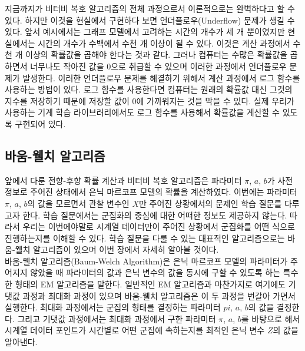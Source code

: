 \documentclass[a4paper]{oblivoir}
\begin{document}
지금까지가 비터비 복호 알고리즘의 전체 과정으로서 이론적으로는 완벽하다고 할 수 있다. 하지만 이것을 현실에서 구현하다 보면 언더플로우(Underflow) 문제가 생길 수 있다. 앞서 예시에서는 그래프 모델에서 고려하는 시간의 개수가 세 개 뿐이였지만 현실에서는 시간의 개수가 수백에서 수천 개 이상이 될 수 있다. 이것은 계산 과정에서 수천 개 이상의 확률값을 곱해야 한다는 것과 같다. 그러나 컴퓨터는 수많은 확률값을 곱하면서 너무나도 작아진 값을 0으로 취급할 수 있으며 이러한 과정에서 언더플로우 문제가 발생한다. 이러한 언더플로우 문제를 해결하기 위해서 계산 과정에서 로그 함수를 사용하는 방법이 있다. 로그 함수를 사용한다면 컴퓨터는 원래의 확률값 대신 그것의 지수를 저장하기 때문에 저장할 값이 0에 가까워지는 것을 막을 수 있다. 실제 우리가 사용하는 기계 학습 라이브러리에서도 로그 함수를 사용해서 확률값을 계산할 수 있도록 구현되어 있다. \\

\subsection{바움-웰치 알고리즘}

앞에서 다룬 전향-후향 확률 계산과 비터비 복호 알고리즘은 파라미터 $\pi$, $a$, $b$가 사전 정보로 주어진 상태에서 은닉 마르코프 모델의 확률을 계산하였다. 이번에는 파라미터 $\pi$, $a$, $b$의 값을 모르면서 관찰 변수인 $X$만 주어진 상황에서의 문제인 학습 질문를 다루고자 한다. 학습 질문에서는 군집화의 중심에 대한 어떠한 정보도 제공하지 않는다. 따라서 우리는 이번에야말로 시계열 데이터만이 주어진 상황에서 군집화를 어떤 식으로 진행하는지를 이해할 수 있다. 학습 질문을 다룰 수 있는 대표적인 알고리즘으로는 바움-웰치 알고리즘이 있으며 이번 장에서 자세히 알아볼 것이다. \\

바움-웰치 알고리즘(Baum-Welch Algorithm)은 은닉 마르코프 모델의 파라미터가 주어지지 않았을 때 파라미터의 값과 은닉 변수의 값을 동시에 구할 수 있도록 하는 특수한 형태의 EM 알고리즘을 말한다. 일반적인 EM 알고리즘과 마찬가지로 여기에도 기댓값 과정과 최대화 과정이 있으며 바움-웰치 알고리즘은 이 두 과정을 번갈아 가면서 실행한다. 최대화 과정에서는 군집의 형태를 결정하는 파라미터 $pi$, $a$, $b$의 값을 결정한다. 그리고 기댓값 과정에서는 최대화 과정에서 구한 파라미터 $\pi$, $a$, $b$를 바탕으로 해서 시계열 데이터 포인트가 시간별로 어떤 군집에 속하는지를 최적인 은닉 변수 $Z$의 값을 알아낸다. \\
\end{document}

